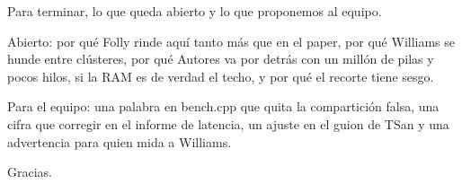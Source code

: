 Para terminar, lo que queda abierto y lo que proponemos al equipo.

Abierto: por qué Folly rinde aquí tanto más que en el paper, por qué Williams se hunde entre clústeres, por qué Autores va por detrás con un millón de pilas y pocos hilos, si la RAM es de verdad el techo, y por qué el recorte tiene sesgo.

Para el equipo: una palabra en bench.cpp que quita la compartición falsa, una cifra que corregir en el informe de latencia, un ajuste en el guion de TSan y una advertencia para quien mida a Williams.

Gracias.
